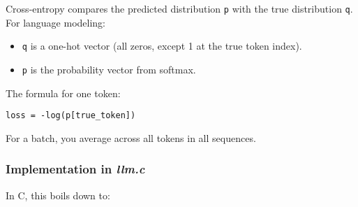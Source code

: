 \documentclass[
  letterpaper,
  DIV=11,
  numbers=noendperiod]{scrreprt}
\providecommand{\tightlist}{%
  \setlength{\itemsep}{0pt}\setlength{\parskip}{0pt}}
\begin{document}
Cross-entropy compares the predicted distribution \texttt{p} with the
true distribution \texttt{q}. For language modeling:

\begin{itemize}
\tightlist
\item
  \texttt{q} is a one-hot vector (all zeros, except 1 at the true token
  index).
\item
  \texttt{p} is the probability vector from softmax.
\end{itemize}

The formula for one token:

\begin{verbatim}
loss = -log(p[true_token])
\end{verbatim}

For a batch, you average across all tokens in all sequences.

\subsubsection{\texorpdfstring{Implementation in
\emph{llm.c}}{Implementation in llm.c}}\label{implementation-in-llm.c-5}

In C, this boils down to:
\end{document}
